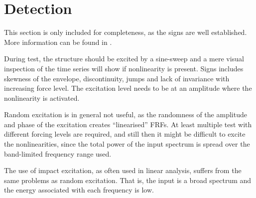
\section{Detection}
\label{sec:detection}

This section is only included for completeness, as the signs are well
established. More information can be found in \autocite{worden2000nonlinearity}.

During test, the structure should be excited by a sine-sweep and a mere visual
inspection of the time series will show if nonlinearity is present. Signs
includes skewness of the envelope, discontinuity, jumps and lack of invariance
with increasing force level. The excitation level needs to be at an amplitude
where the nonlinearity is activated.

Random excitation is in general not useful, as the randomness of the amplitude
and phase of the excitation creates ``linearised'' FRFs. At least multiple test
with different forcing levels are required, and still then it might be difficult
to excite the nonlinearities, since the total power of the input spectrum is
spread over the band-limited frequency range used.

The use of impact excitation, as often used in linear analysis, suffers from the
same problems as random excitation. That is, the input is a broad spectrum and
the energy associated with each frequency is low.

